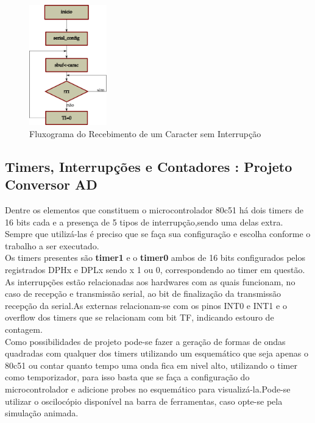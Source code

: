\documentclass{Fabiano_file}
\begin{document}
{\begin{figure}[h!]
\centering
\includegraphics[width=0.3\textwidth]{fluxograma__envio_de_caracter.pdf}
\caption{Fluxograma do Recebimento de um Caracter sem Interrupção}
\label{fig:fluxograma__envio_de_caracter}
\end{figure}

\pagebreak

\subsection{Timers, Interrupções e Contadores : Projeto Conversor AD}
Dentre os elementos que constituem o microcontrolador 80c51 há dois timers de 16 bits cada e a presença de 5 tipos de interrupção,sendo uma delas extra.
Sempre que utilizá-las é preciso que se faça sua configuração e escolha conforme o trabalho a ser executado.\\

Os timers presentes são \textbf{timer1} e o \textbf{timer0} ambos de 16 bits configurados pelos registrados DPHx e DPLx sendo x 1 ou 0, correspondendo ao timer em 
questão.\\

As interrupções estão relacionadas aos hardwares com as quais funcionam, no caso de recepção e transmissão serial, ao bit de finalização da transmissão recepção
da serial.As externas relacionam-se com os pinos INT0 e INT1 e o overflow dos timers que se relacionam com bit TF, indicando estouro de contagem.\\

Como possibilidades de projeto pode-se fazer a geração de formas de ondas quadradas com qualquer dos timers utilizando um esquemático que seja apenas o 80c51
ou contar quanto tempo uma onda fica em nivel alto, utilizando o timer como temporizador, para isso basta que se faça a configuração do microcontrolador 
e adicione probes no esquemático para visualizá-la.Pode-se utilizar o oscilocópio disponível na barra de ferramentas, caso opte-se pela simulação animada.\\

}
\end{document}
